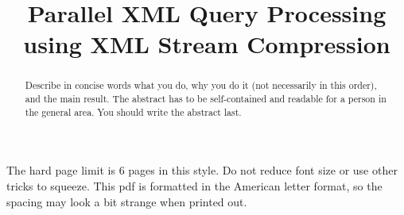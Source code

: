 \documentclass[letterpaper]{article}
\title{Parallel XML Query Processing using XML Stream Compression}
\begin{document}
%
\maketitle
%

The hard page limit is 6 pages in this style. Do not reduce font size
or use other tricks to squeeze. This pdf is formatted in the American letter format, so the spacing may look a bit strange when printed out.

\begin{abstract}
Describe in concise words what you do, why you do it (not necessarily
in this order), and the main result.  The abstract has to be
self-contained and readable for a person in the general area. You
should write the abstract last.
\end{abstract}
















\end{document}
